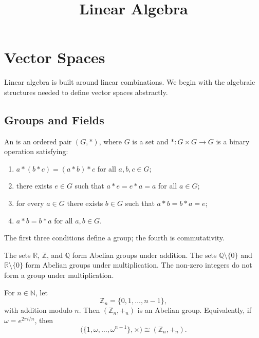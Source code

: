 
\title{\textbf{Linear Algebra}}
\author{}
\date{}
\maketitle

\begingroup
\let\clearpage\relax
\tableofcontents
\endgroup

\clearpage

\section{Vector Spaces}\label{sec:VectorSpaces}

Linear algebra is built around linear combinations. We begin with the algebraic structures needed to define vector spaces abstractly.

\subsection{Groups and Fields}

\begin{Definition}
An  is an ordered pair $(G,*)$, where $G$ is a set and $*\colon G\times G\to G$ is a binary operation satisfying:
\begin{enumerate}
\item $a*(b*c)=(a*b)*c$ for all $a,b,c\in G$;
\item there exists $e\in G$ such that $a*e=e*a=a$ for all $a\in G$;
\item for every $a\in G$ there exists $b\in G$ such that $a*b=b*a=e$;
\item $a*b=b*a$ for all $a,b\in G$.
\end{enumerate}
The first three conditions define a group; the fourth is commutativity.
\end{Definition}

\begin{Example}
The sets $\mathbb R$, $\mathbb Z$, and $\mathbb Q$ form Abelian groups under addition. The sets $\mathbb Q\setminus\{0\}$ and $\mathbb R\setminus\{0\}$ form Abelian groups under multiplication. The non-zero integers do not form a group under multiplication.

For $n\in\mathbb N$, let
\begin{equation*}
\mathbb Z_n=\{0,1,\ldots,n-1\},
\end{equation*}
with addition modulo $n$. Then $(\mathbb Z_n,+_n)$ is an Abelian group. Equivalently, if $\omega=e^{2\pi i/n}$, then
\begin{equation*}
\bigl(\{1,\omega,\ldots,\omega^{n-1}\},\times\bigr)
\cong (\mathbb Z_n,+_n).
\end{equation*}
\end{Example}

